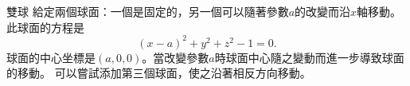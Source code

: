 \begin{surferPage}{雙球}
給定兩個球面：一個是固定的，另一個可以隨著參數$a$的改變而沿$x$軸移動。
此球面的方程是
\[(x-a)^2+y^2+z^2-1=0.\]
球面的中心坐標是$(a,0,0)$。當改變參數$a$時球面中心隨之變動而進一步導致球面的移動。
可以嘗試添加第三個球面，使之沿著相反方向移動。
\end{surferPage}
